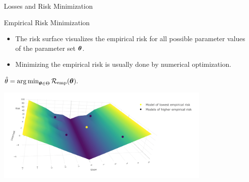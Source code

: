 \documentclass[11pt,compress,t,notes=noshow, xcolor=table]{beamer}
\begin{document}
\begin{vbframe}{Losses and Risk Minimization}


\end{vbframe}


\begin{vbframe}{Empirical Risk Minimization}

\begin{itemize}
\item \small The risk surface visualizes the empirical risk for all possible parameter values of the parameter set $\bm{\theta}$.
\item \small Minimizing the empirical risk is usually done by numerical optimization.
\end{itemize}

\begin{center}
$
\hat{\theta} = \operatorname{arg\,min}_{\bm{\theta} \in \Theta} \mathcal{R}_{\text{emp}}(\bm{\theta}).
$
\end{center}


\begin{center}
 \includegraphics[width = 0.8\textwidth]{slides/ml-basics/figure_man/nutshell-ml-basics-risk-surface.png}
\end{center}




\end{vbframe}
\end{document}
